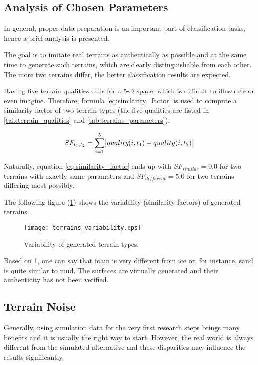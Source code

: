 \subsection{Analysis of Chosen Parameters} \label{ssec:terrains_analysis}
In general, proper data preparation is an important part of classification tasks, hence a brief analysis is presented.

The goal is to imitate real terrains as authentically as possible and at the same time to generate such terrains, which are clearly distinguishable from each other. The more two terrains differ, the better classification results are expected.

Having five terrain qualities calls for a 5-D space, which is difficult to illustrate or even imagine. Therefore, formula \ref{eq:similarity_factor} is used to compute a similarity factor of two terrain types (the five qualities are listed in \cref{tab:terrain_qualities} and \cref{tab:terrains_parameters}).


\begin{equation} 
\label{eq:similarity_factor}
  SF_{t_1, t_2} = \displaystyle\sum_{i=1}^{5} \abs{quality(i, t_1) - quality(i, t_2)}
\end{equation} 

Naturally, equation \ref{eq:similarity_factor} ends up with $ SF_{similar} = 0.0 $ for two terrains with exactly same parameters and $ SF_{different} = 5.0 $ for two terrains differing most possibly.

The following figure (\ref{fig:terrains_parameters}) shows the variability (similarity factors) of generated terrains.

\begin{figure}[H]
  \centering
  \texttt{[image: terrains\_variability.eps]}
  \caption{Variability of generated terrain types.}
  \label{fig:terrains_parameters}
\end{figure}

Based on \cref{fig:terrains_parameters}, one can say that foam is very different from ice or, for instance, sand is quite similar to mud. The surfaces are virtually generated and their authenticity has not been verified. 

\subsection{Terrain Noise} \label{ssec:terrain_noise}
Generally, using simulation data for the very first research steps brings many benefits and it is usually the right way to start. However, the real world is always different from the simulated alternative and these disparities may influence the results significantly.

